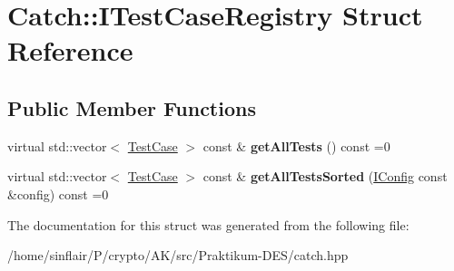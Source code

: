 \hypertarget{structCatch_1_1ITestCaseRegistry}{}\section{Catch\+:\+:I\+Test\+Case\+Registry Struct Reference}
\label{structCatch_1_1ITestCaseRegistry}
\subsection*{Public Member Functions}
\begin{DoxyCompactItemize}
\item 
\mbox{\label{structCatch_1_1ITestCaseRegistry_ad6e4d4a621655123f73ae98cfeda063d}} 
virtual std\+::vector$<$ \hyperlink{classCatch_1_1TestCase}{Test\+Case} $>$ const  \& {\bfseries get\+All\+Tests} () const =0
\item 
\mbox{\label{structCatch_1_1ITestCaseRegistry_a33e46639d0319d35497c05bb5d02be5a}} 
virtual std\+::vector$<$ \hyperlink{classCatch_1_1TestCase}{Test\+Case} $>$ const  \& {\bfseries get\+All\+Tests\+Sorted} (\hyperlink{structCatch_1_1IConfig}{I\+Config} const \&config) const =0
\end{DoxyCompactItemize}


The documentation for this struct was generated from the following file\+:\begin{DoxyCompactItemize}
\item 
/home/sinflair/\+P/crypto/\+A\+K/src/\+Praktikum-\/\+D\+E\+S/catch.\+hpp\end{DoxyCompactItemize}
